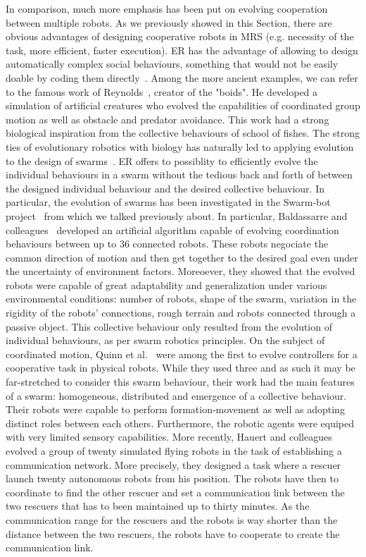     In comparison, much more emphasis has been put on evolving cooperation between multiple robots. As we previously showed in this Section, there are obvious advantages of designing cooperative robots in MRS (e.g. necessity of the task, more efficient, faster execution). ER has the advantage of allowing to design automatically complex social behaviours, something that would not be easily doable by coding them directly~\cite{Baldassarre2003}. Among the more ancient examples, we can refer to the famous work of Reynolds~\cite{Reynolds1992}, creator of the "boids". He developed a simulation of artificial creatures who evolved the capabilities of coordinated group motion as well as obstacle and predator avoidance. This work had a strong biological inspiration from the collective behaviours of school of fishes. The strong ties of evolutionary robotics with biology has naturally led to applying evolution to the design of swarms~\cite{Brambilla2012, Francesca2016}. ER offers to possiblity to efficiently evolve the individual behaviours in a swarm without the tedious back and forth of between the designed individual behaviour and the desired collective behaviour. In particular, the evolution of swarms has been investigated in the Swarm-bot project~\cite{Mondada2005} from which we talked previously about. In particular, Baldassarre and colleagues~\cite{Baldassarre2007} developed an artificial algorithm capable of evolving coordination behaviours between up to $36$ connected robots. These robots negociate the common direction of motion and then get together to the desired goal even under the uncertainty of environment factors. Moreoever, they showed that the evolved robots were capable of great adaptability and generalization under various environmental conditions: number of robots, shape of the swarm, variation in the rigidity of the robots' connections, rough terrain and robots connected through a passive object. This collective behaviour only resulted from the evolution of individual behaviours, as per swarm robotics principles. On the subject of coordinated motion, Quinn et al.~\cite{Quinn2003} were among the first to evolve controllers for a cooperative task in physical robots. While they used three and as such it may be far-stretched to consider this swarm behaviour, their work had the main features of a swarm: homogeneous, distributed and emergence of a collective behaviour. Their robots were capable to perform formation-movement as well as adopting distinct roles between each others. Furthermore, the robotic agents were equiped with very limited sensory capabilities. More recently, Hauert and colleagues~\cite{Hauert2014} evolved a group of twenty simulated flying robots in the task of establishing a communication network. More precisely, they designed a task where a rescuer launch twenty autonomous robots from his position. The robots have then to coordinate to find the other rescuer and set a communication link between the two rescuers that has to been maintained up to thirty minutes. As the communication range for the rescuers and the robots is way shorter than the distance between the two rescuers, the robots have to cooperate to create the communication link. 

